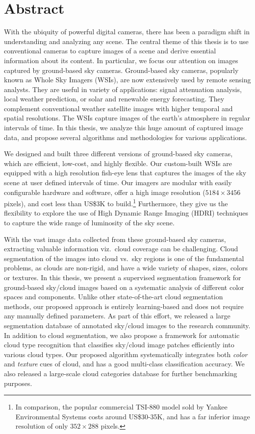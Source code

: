 \chapter*{\centering Abstract}



With the ubiquity of powerful digital cameras, there has been a paradigm shift in understanding and analyzing any scene. The central theme of this thesis is to use conventional cameras to capture images of a scene and derive essential information about its content. In particular, we focus our attention on images captured by ground-based sky cameras. Ground-based sky cameras, popularly known as Whole Sky Imagers (WSIs), are now extensively used by remote sensing analysts. They are useful in variety of applications: signal attenuation analysis, local weather prediction, or solar and renewable energy forecasting. They complement conventional weather satellite images with higher temporal and spatial resolutions. The WSIs capture images of the earth's atmosphere in regular intervals of time. In this thesis, we analyze this huge amount of captured image data, and propose several algorithms and methodologies for various applications.

We designed and built three different versions of ground-based sky cameras, which are efficient, low-cost, and highly flexible. Our custom-built WSIs are equipped with a high resolution fish-eye lens that captures the images of the sky scene at user defined intervals of time. Our imagers are modular with easily configurable hardware and software, offer a high image resolution ($5184\times3456$ pixels), and cost less than US\$3K to build.\footnote{In comparison, the popular commercial TSI-880 model sold by Yankee Environmental Systems costs around US\$30-35K, and has a far inferior image resolution of only $352\times288$ pixels.} Furthermore, they give us the flexibility to explore the use of High Dynamic Range Imaging (HDRI) techniques to capture the wide range of luminosity of the sky scene. 

With the vast image data collected from these ground-based sky cameras, extracting valuable information viz.\ cloud coverage can be challenging. Cloud segmentation of the images into cloud vs.\ sky regions is one of the fundamental problems, as clouds are non-rigid, and have a wide variety of shapes, sizes, colors or textures. In this thesis, we present a supervised segmentation framework for ground-based sky/cloud images based on a systematic analysis of different color spaces and components. Unlike other state-of-the-art cloud segmentation methods, our proposed approach is entirely learning-based and does not require any manually defined parameters. As part of this effort, we released a large segmentation database of annotated sky/cloud images to the research community. In addition to cloud segmentation, we also propose a framework for automatic cloud type recognition that classifies sky/cloud image patches efficiently into various cloud types. Our proposed algorithm systematically integrates both \emph{color} and \emph{texture} cues of cloud, and has a good multi-class classification accuracy. We also released a large-scale cloud categories database for further benchmarking purposes. 

